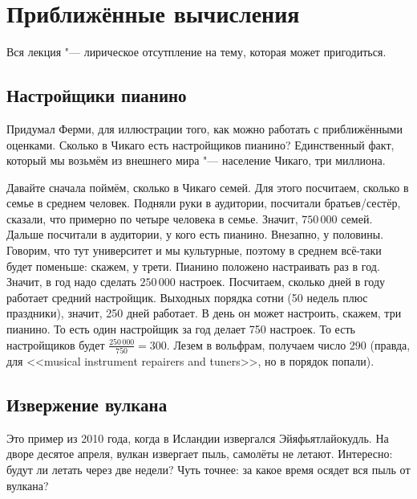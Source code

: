 
\section{Приближённые вычисления}
Вся лекция "--- лирическое отсутпление на тему, которая может пригодиться.


\subsection{Настройщики пианино}
Придумал Ферми, для иллюстрации того, как можно работать с приближёнными оценками.
Сколько в Чикаго есть настройщиков пианино?
Единственный факт, который мы возьмём из внешнего мира "--- население Чикаго, три миллиона.

Давайте сначала поймём, сколько в Чикаго семей.
Для этого посчитаем, сколько в семье в среднем человек.
Подняли руки в аудитории, посчитали братьев/сестёр, сказали, что примерно по четыре человека в семье.
Значит, $750\,000$ семей.
Дальше посчитали в аудитории, у кого есть пианино.
Внезапно, у половины.
Говорим, что тут университет и мы культурные, поэтому в среднем всё-таки будет поменьше: скажем, у трети.
Пианино положено настраивать раз в год.
Значит, в год надо сделать $250\,000$ настроек.
Посчитаем, сколько дней в году работает средний настройщик.
Выходных порядка сотни (50 недель плюс праздники), значит, 250 дней работает.
В день он может настроить, скажем, три пианино.
То есть один настройщик за год делает 750 настроек.
То есть настройщиков будет $\frac{250\,000}{750} = 300$.
Лезем в вольфрам, получаем число 290 (правда, для <<musical instrument repairers and tuners>>, но в порядок попали).

\subsection{Извержение вулкана}
Это пример из 2010 года, когда в Исландии извергался Эйяфьятлайокудль.
На дворе десятое апреля, вулкан извергает пыль, самолёты не летают.
Интересно: будут ли летать через две недели?
Чуть точнее: за какое время осядет вся пыль от вулкана?

